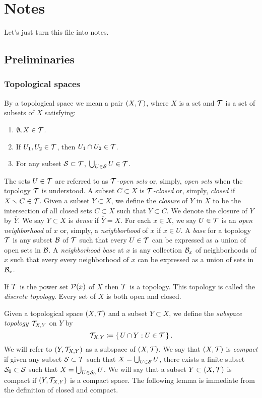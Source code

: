 \chapter{Notes}
Let's just turn this file into notes.

\section{Preliminaries}
\subsection{Topological spaces}
By a topological space we mean a pair $(X,\mathcal{T})$, where $X$ is a set and
$\mathcal{T}$ is a set of subsets of $X$ satisfying:
\begin{enumerate}[label=(\roman*)]
\item $\emptyset,X\in\mathcal{T}$.
\item If $U_1,U_2\in\mathcal{T}$, then $U_1\cap U_2\in\mathcal{T}$.
\item For any subset $\mathcal{S}\subset\mathcal{T}$, $\bigcup_{U\in\mathcal{S}} U\in\mathcal{T}$.
\end{enumerate}

The sets $U\in\mathcal{T}$ are referred to as \emph{$\mathcal{T}$-open sets} or,
simply, \emph{open sets} when the topology $\mathcal{T}$ is understood. A subset
$C\subset X$ is \emph{$\mathcal{T}$-closed} or, simply, \emph{closed} if
$X\minus C\in\calT$. Given a subset $Y\subset X$, we define the
\emph{closure} of $Y$ in $X$ to be the intersection of all closed sets
$C\subset X$ such that $Y\subset C$. We denote the closure of $Y$ by
$\overline Y$. We say $Y\subset X$ is \emph{dense} if $\overline Y=X$. For
each $x\in X$, we say $U\in\mathcal{T}$ is an \emph{open neighborhood} of $x$ or,
simply, a \emph{neighborhood} of $x$ if $x\in U$. A \emph{base} for a
topology $\mathcal{T}$ is any subset $\mathcal{B}$ of $\mathcal{T}$ such that every
$U\in\mathcal{T}$ can be expressed as a union of open sets in $\mathcal{B}$. A
\emph{neighborhood base} at $x$ is any collection $\mathcal{B}_x$ of
neighborhoods of $x$ such that every every neighborhood of $x$ can be
expressed as a union of sets in $\mathcal{B}_x$.

\begin{example}
If $\mathcal{T}$ is the power set $\mathcal{P}(x)$ of $X$ then $\mathcal{T}$ is a
topology. This topology is called the \emph{discrete topology}. Every set
of $X$ is both open and closed.
\end{example}

Given a topological space $(X,\mathcal{T})$ and a subset $Y\subset X$, we define
the \emph{subspace topology $\mathcal{T}_{X,Y}$} on $Y$ by
\begin{equation}
  \label{eq:subspace-topology}
\mathcal{T}_{X,Y}\coloneqq\left\{\,U\cap Y:U\in\mathcal{T}\,\right\}.
\end{equation}
We will refer to $(Y,\mathcal{T}_{X,Y})$ as a subspace of $(X,\mathcal{T})$. We say
that $(X,\mathcal{T})$ is \emph{compact} if given any subset $\mathcal{S}\subset\mathcal{T}$
such that $X=\bigcup_{U\in\mathcal{S}} U$, there exists a finite subset
$\mathcal{S}_0\subset\mathcal{S}$ such that $X=\bigcup_{U\in\mathcal{S}_0} U$. We will say
that a subset $Y\subset(X,\mathcal{T})$ is compact if $(Y,\mathcal{T}_{X,Y})$ is a
compact space. The following lemma is immediate from the definition of
closed and compact.

